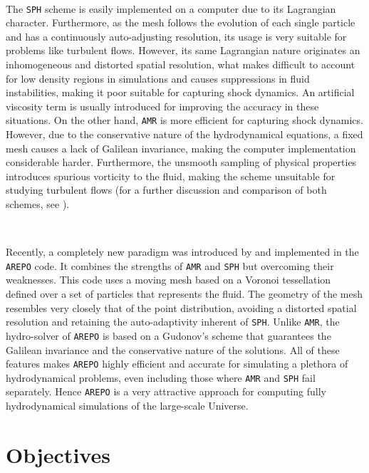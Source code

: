 \documentclass[a4,useAMS,usenatbib,usegraphicx,12pt]{article}
\begin{document}
\

The \texttt{SPH} scheme is easily implemented on a computer due to its 
Lagrangian character. Furthermore, as the mesh follows the evolution of each 
single particle and has a continuously auto-adjusting resolution, its usage is 
very suitable for problems like turbulent flows. However, its same Lagrangian 
nature originates an inhomogeneous and distorted spatial resolution, what makes 
difficult to account for low density regions in simulations and causes 
suppressions in fluid instabilities, making it poor suitable for capturing shock
dynamics. An artificial viscosity term is usually introduced for improving the 
accuracy in these situations. On the other hand, \texttt{AMR} is more efficient 
for capturing shock dynamics. However, due to the conservative nature of the 
hydrodynamical equations, a fixed mesh causes a lack of Galilean invariance, 
making the computer implementation considerable harder. Furthermore, the 
unsmooth sampling of physical properties introduces spurious vorticity to the 
fluid, making the scheme unsuitable for studying turbulent flows (for a further
discussion and comparison of both schemes, see \citet{Plewa01}).

\

Recently, a completely new paradigm was introduced by \citet{Springel10} and 
implemented in the \texttt{AREPO} code. It combines the strengths of 
\texttt{AMR} and \texttt{SPH} but overcoming their weaknesses. This code uses 
a moving mesh based on a Voronoi tessellation defined over a set of particles
that represents the fluid. The geometry of the mesh resembles very closely that 
of the point distribution, avoiding a distorted spatial resolution and retaining 
the auto-adaptivity inherent of \texttt{SPH}. Unlike \texttt{AMR}, the 
hydro-solver of \texttt{AREPO} is based on a Gudonov's scheme that guarantees the
Galilean invariance and the conservative nature of the solutions. All of these 
features makes \texttt{AREPO} highly efficient and accurate for simulating a 
plethora of hydrodynamical problems, even including those where \texttt{AMR} and
\texttt{SPH} fail separately. Hence \texttt{AREPO} is a very attractive approach 
for computing fully hydrodynamical simulations of the large-scale Universe.




\newpage
\section{Objectives}
\end{document}
